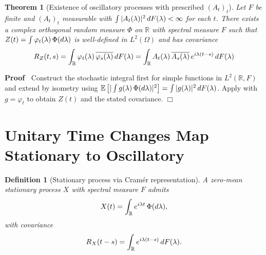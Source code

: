 \documentclass{article}
\newenvironment{proof}{\noindent\textbf{Proof\ }}{\hspace*{\fill}$\Box$\medskip}
\newtheorem{definition}{Definition}
\newtheorem{theorem}{Theorem}
\begin{document}
\begin{theorem}
  [Existence of oscillatory processes with prescribed $(A_t)_t$] Let $F$ be
  finite and $(A_t)_t$ measurable with $\int |A_t (\lambda) |^2 
  \hspace{0.17em} dF (\lambda) < \infty$ for each $t$. There exists a complex
  orthogonal random measure $\Phi$ on $\mathbb{R}$ with spectral measure $F$
  such that $Z (t) = \int \varphi_t (\lambda)  \hspace{0.17em} \Phi (d
  \lambda)$ is well-defined in $L^2 (\Omega)$ and has covariance
  \begin{equation}
    R_Z (t, s) = \int_{\mathbb{R}} \varphi_t (\lambda) \hspace{0.17em}
    \overline{\varphi_s (\lambda)} \hspace{0.17em} dF (\lambda) =
    \int_{\mathbb{R}} A_t (\lambda) \hspace{0.17em} \overline{A_s (\lambda)}
    \hspace{0.17em} e^{i \lambda (t - s)}  \hspace{0.17em} dF (\lambda)
  \end{equation}
\end{theorem}

\begin{proof}
  Construct the stochastic integral first for simple functions in $L^2 
  (\mathbb{R}, F)$ and extend by isometry using $\mathbb{E} \left[ | \int g
  (\lambda) \hspace{0.17em} \Phi (d \lambda) |^2 \right] = \int |g (\lambda)
  |^2  \hspace{0.17em} dF (\lambda)$. Apply with $g = \varphi_t$ to obtain $Z
  (t)$ and the stated covariance.
\end{proof}

\section{Unitary Time Changes Map Stationary to Oscillatory}

\begin{definition}
  [Stationary process via Cram{\'e}r representation] A zero-mean stationary
  process $X$ with spectral measure $F$ admits
  \begin{equation}
    X (t) = \int_{\mathbb{R}} e^{i \lambda t}  \hspace{0.17em} \Phi (d
    \lambda),
  \end{equation}
  with covariance
  \begin{equation}
    R_X  (t - s) = \int_{\mathbb{R}} e^{i \lambda (t - s)}  \hspace{0.17em} dF
    (\lambda) .
  \end{equation}
\end{definition}
\end{document}
